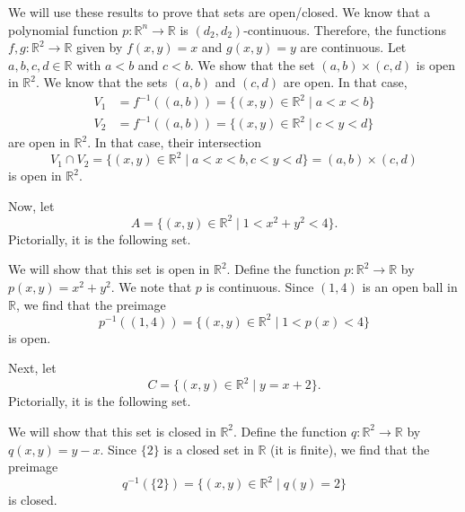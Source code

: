 \documentclass[a4paper, openany]{memoir}
\theoremstyle{definition}
\theoremstyle{plain}
\begin{document}
We will use these results to prove that sets are open/closed. We know that a polynomial function $p: \mathbb{R}^n \to \mathbb{R}$ is $(d_2, d_2)$-continuous. Therefore, the functions $f, g: \mathbb{R}^2 \to \mathbb{R}$ given by $f(x, y) = x$ and $g(x, y) = y$ are continuous. Let $a, b, c, d \in \mathbb{R}$ with $a < b$ and $c < b$. We show that the set $(a, b) \times (c, d)$ is open in $\mathbb{R}^2$. We know that the sets $(a, b)$ and $(c, d)$ are open. In that case,
\begin{align*}
    V_1 &= f^{-1}((a, b)) = \{(x, y) \in \mathbb{R}^2 \mid a < x < b\} \\
    V_2 &= f^{-1}((a, b)) = \{(x, y) \in \mathbb{R}^2 \mid c < y < d\} 
\end{align*}
are open in $\mathbb{R}^2$. In that case, their intersection
\[V_1 \cap V_2 = \{(x, y) \in \mathbb{R}^2 \mid a < x < b, c < y < d\} = (a, b) \times (c, d)\]
is open in $\mathbb{R}^2$.

Now, let
\[A = \{(x, y) \in \mathbb{R}^2 \mid 1 < x^2 + y^2 < 4\}.\]
Pictorially, it is the following set.
\begin{figure}[H]
    \centering
\end{figure}
\noindent We will show that this set is open in $\mathbb{R}^2$. Define the function $p: \mathbb{R}^2 \to \mathbb{R}$ by $p(x, y) = x^2 + y^2$. We note that $p$ is continuous. Since $(1, 4)$ is an open ball in $\mathbb{R}$, we find that the preimage
\[p^{-1}((1, 4)) = \{(x, y) \in \mathbb{R}^2 \mid 1 < p(x) < 4\}\]
is open.

Next, let
\[C = \{(x, y) \in \mathbb{R}^2 \mid y = x + 2\}.\]
Pictorially, it is the following set.
\begin{figure}[H]
    \centering
\end{figure}
\noindent We will show that this set is closed in $\mathbb{R}^2$. Define the function $q: \mathbb{R}^2 \to \mathbb{R}$ by $q(x, y) = y - x$. Since $\{2\}$ is a closed set in $\mathbb{R}$ (it is finite), we find that the preimage
\[q^{-1}(\{2\}) = \{(x, y) \in \mathbb{R}^2 \mid q(y) = 2\}\]
is closed. 
\end{document}
